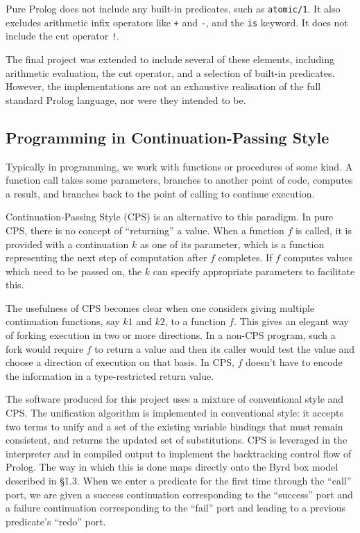 \documentclass[12pt]{article}
\begin{document}
Pure Prolog does not include any built-in predicates, such as \verb|atomic/1|. 
It also excludes arithmetic infix operators like \verb|+| and \verb|-|, and the \verb|is| keyword. 
It does not include the cut operator \verb|!|.

The final project was extended to include several of these elements, including arithmetic evaluation, the cut operator, and a selection of built-in predicates.
However, the implementations are not an exhaustive realisation of the full standard Prolog language, nor were they intended to be.

\subsection{Programming in Continuation-Passing Style}

Typically in programming, we work with functions or procedures of some kind. 
A function call takes some parameters, branches to another point of code, computes a result, and branches back to the point of calling to continue execution.

Continuation-Passing Style (CPS) is an alternative to this paradigm. 
In pure CPS, there is no concept of ``returning'' a value. 
When a function $f$ is called, it is provided with a continuation $k$ as one of its parameter, which is a function representing the next step of computation after $f$ completes. 
If $f$ computes values which need to be passed on, the $k$ can specify appropriate parameters to facilitate this.

The usefulness of CPS becomes clear when one considers giving multiple continuation functions, say $k1$ and $k2$, to a function $f$. 
This gives an elegant way of forking execution in two or more directions. 
In a non-CPS program, such a fork would require $f$ to return a value and then its caller would test the value and choose a direction of execution on that basis. 
In CPS, $f$ doesn't have to encode the information in a type-restricted return value.

The software produced for this project uses a mixture of conventional style and CPS. 
The unification algorithm is implemented in conventional style: it accepts two terms to unify and a set of the existing variable bindings that must remain consistent, and returns the updated set of substitutions. 
CPS is leveraged in the interpreter and in compiled output to implement the backtracking control flow of Prolog.
The way in which this is done maps directly onto the Byrd box model described in \S1.3. When we enter a predicate for the first time through the ``call'' port, we are given a success continuation corresponding to the ``success'' port and a failure continuation corresponding to the ``fail'' port and leading to a previous predicate's ``redo'' port.
\end{document}
